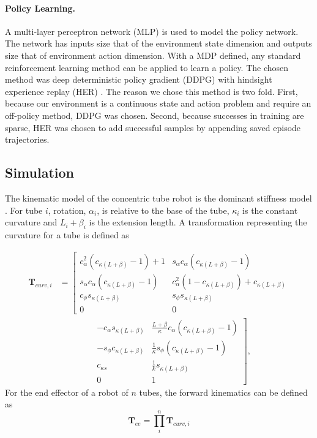 \paragraph{Policy Learning.} A multi-layer perceptron network (MLP) is used to model the policy network. The network has inputs size that of the environment state dimension and outputs size that of environment action dimension. With a MDP defined, any standard reinforcement learning method can be applied to learn a policy. The chosen method was deep deterministic policy gradient (DDPG) \cite{Lillicrap2015} with hindsight experience replay (HER) \cite{andrychowicz2017hindsight}. The reason we chose this method is two fold. First, because our environment is a continuous state and action problem and require an off-policy method, DDPG was chosen. Second, because successes in training are sparse, HER was chosen to add successful samples by appending saved episode trajectories.

\subsection{Simulation}
The kinematic model of the concentric tube robot is the dominant stiffness model \cite{Dupont2010}. For tube $i$, rotation, $\alpha_i$, is relative to the base of the tube, $\kappa_i$ is the constant curvature and $L_i + \beta_i$ is the extension length. A transformation representing the curvature for a tube is defined as

\begin{equation}\label{eqn:curvature-transformation}
\begin{aligned}
\textbf{T}_{curv,i} &=
\left[\begin{matrix}
  c^2_\alpha (c_{\kappa  \left(L+\beta\right)} - 1) + 1 & s_\alpha c_\alpha (c_{\kappa  \left(L+\beta\right)} - 1) \\
  s_\alpha c_\alpha (c_{\kappa  \left(L+\beta\right)} - 1) & c^2_\alpha (1 - c_{\kappa  \left(L+\beta\right)}) + c_{\kappa  \left(L+\beta\right)} \\
  c_{\phi} s_{\kappa  \left(L+\beta\right)} & s_{\phi} s_{\kappa  \left(L+\beta\right)} \\
  0 & 0
\end{matrix}\right.\\
&\qquad\qquad
\left.\begin{matrix}
  - c_\alpha s_{\kappa  \left(L+\beta\right)}  & \frac{L+\beta}{\kappa} c_\alpha (c_{\kappa \left(L+\beta\right)} - 1) \\
  - s_\phi c_{\kappa \left(L+\beta\right)} & \frac{1}{\kappa} s_\phi (c_{\kappa  \left(L+\beta\right)} - 1) \\
  c_{\kappa s} & \frac{1}{k} s_{\kappa  \left(L+\beta\right)} \\
  0 & 1
\end{matrix}\right],
\end{aligned}
\end{equation}
For the end effector of a robot of $n$ tubes, the forward kinematics can be defined as
\begin{equation}
\textbf{T}_{ee} = \prod^{n}_{i} \textbf{T}_{curv,i} \label{eqn:end-effector-transformation}
\end{equation}


